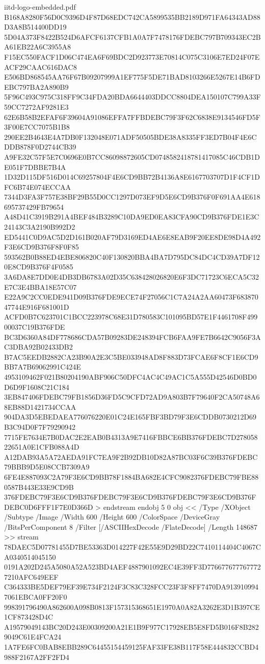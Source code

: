 \begin{filecontents*}[overwrite]{iitd-logo-embedded.pdf}
B168A8280F56D0C9396D4F87D68EDC742CA5899535BB2189D971FA64343AD88D3A8B514400DD19
5D04A373F8422B524D6AFCF6137CFB1A0A7F7478176FDEBC797B709343EC2BA61EB22A6C3955A8
F15EC550FACF1D06C474EA6F69BDC2D923773E70814C075C3106E7ED24F07EACF29CAAC616DAC8
E506BD868545AA76F67B09207999A1EF775F5DE71BAD8103266E5267E14B6FDEBC797BA2A890B9
5F96C493C975C318FF9C34FDA20BDA6644403DDCC8804DEA150107C799A33F59CC7272AF9281E3
62E6B58B2EFAF6F39604A91086EFFA7FFBDEBC79F3F62C6838E9134546FD5F3F00E7CC7075B1B8
290EE2B4643E4A7DB0F132048E071ADF50505BDE38A8335FF3ED7B04F4E6CDDB878F0D2744CB39
A9FE32C57F5E7C0696E0B7CC86098872605CD0748582418781417085C46CDB1DE051F7DBBE7B4A
1D32D115DF516D014C69257804F4E6CD9BB72B4136A8E6167703707D1F4CF1DFC6B74E074ECCAA
7344D3FA3F757E38BF29B55D0CC1297D073EF9D5E6CD9B376F0F691AA4E618695737429FB79654
A48D41C3919B291A4BEF484B3289C10DA9ED0EA83CFA90CD9B376FDE1E3C24143C3A2190B992D2
ED5441C0D9AC5D2D161B020AF79D3169ED4AE6E8EAB9F20EE8DE98D4A492F3E6CD9B376F8F0F85
593562B0B88ED4EBE806820C40F130820BBA4BA7D795DC84DC4CD39A7DF120E8CD9B376F4F0585
3A6DA8E7DD0E4DB3DB6783A02D35C638428026820E6F3DC71723C6ECA5C32E7C3E4BBA18E57C07
E22A9C2CC0EDE941D09B376FDE9ECE74F27056C1C7A24A2AA60473F68387047744E916F681001D
ACFD0B7C623701C1BCC223978C68E31D780583C101095BD57E1F4461708F49900037C19B376FDE
BC3D6360A84DF778686CDA57B09283DE248394FCB6FAA9FE7B6642C9056F3AC3DBA92B02433DB2
B7AC5EEDB2882CA23B90A2E3C5BE033948AD8F883D73FCAE6F8CF1E6CD9BB7A7B69062991C424E
4953109462F021B80204190ABF906C50DFC4AC4C49AC1C5A555D42546D0BD0D6D9F1608C21C184
3EB847406FDEBC79FB1856D36FD5C9CFD72AD9A803B7F79640F2CA50748A68EB88D1421734CCAA
904DA3D5EBEDAEA776076220E01C24E165FBF3BD79F3E6CDDB0730212D69B3C94D0F7F79290942
7715FE7634E7B0DAC2E2EAB0B4313A9E7416FBBCE6BB376FDEBC7D27805822651A0E1CFB088A4D
A12DAB93A5A72AEDA91FC7EA9F2B92DB10D82A87BC03F6C39B376FDEBC79BBB9D5E08CCB7309A9
6FE4E887093C2A79F3E6CD9BB78F1884BA682E4CFC9082376FDEBC79FBE880587B443E33E9CD9B
376FDEBC79F3E6CD9B376FDEBC79F3E6CD9B376FDEBC79F3E6CD9B376FDEBC0D6FFF1F7E0D366D
>
endstream
endobj
5 0 obj
<< /Type /XObject /Subtype /Image /Width 600 /Height 600 /ColorSpace /DeviceGray /BitsPerComponent 8 /Filter [/ASCIIHexDecode /FlateDecode] /Length 148687 >>
stream
78DAEC5D07781455D7BE53363D014227F42E55E9D29BD22C7410114404C4067CA0340514045150
0191A202D245A5080A52A523BD4AEF4887901092EC4E39FF3D7766776777677727210AFC649EEF
C364333BE5DEF79EF39E734F2124F3C83C328FCC23F3F8FF7470DA9139109947061EBCA0FF20F0
998391796490A862600A098B0813F157315368651E1970A0A82A3262E3D1B397CE1CF873428D4C
A19579049143BC20D243E00309200A21E1B9F977C17928EB5E8FD5B016F8B2829049C61E4FCA24
1A7FE6FC0BAB8EBB289C64455154459125FAF33FE38B117F58E444832CCBD4988F2167A2FF2FD4

\end{filecontents*}

